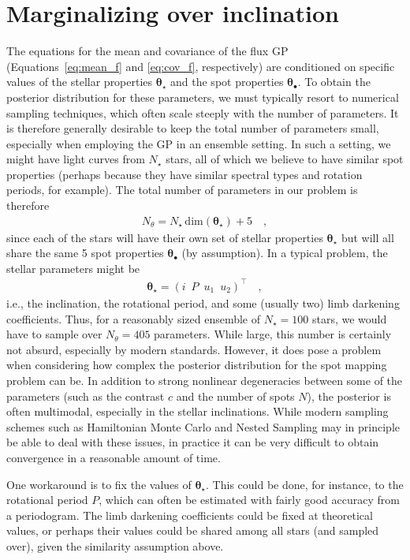 \documentclass[modern]{aastex62}
\begin{document}
\section{Marginalizing over inclination}
%
The equations for the mean and covariance of the flux GP
(Equations~\ref{eq:mean_f} and \ref{eq:cov_f}, respectively) are conditioned
on specific values of the stellar properties $\pmb{\theta}_\star$ and the
spot properties $\pmb{\theta}_\bullet$. To obtain the posterior distribution
for these parameters, we must typically resort to numerical sampling techniques,
which often scale steeply with the number of parameters. It is therefore generally
desirable to keep the total number of parameters small, especially when
employing the GP in an ensemble setting.
In such a setting, we might have light curves from $N_\star$ stars, all of which
we believe to have similar spot properties (perhaps because they have
similar spectral types and rotation periods, for example).
The total number of parameters in our problem is therefore
%
\begin{align}
    N_\theta = N_\star \, \mathrm{dim}(\pmb{\theta}_\star) + 5
    \quad,
\end{align}
%
since each of the stars will have their own set of stellar properties
$\pmb{\theta}_\star$ but will all share the same 5 spot properties
$\pmb{\theta}_\bullet$ (by assumption).
In a typical problem, the stellar parameters might be
%
\begin{align}
    \pmb{\theta}_\star =
    \left(
    i \,\,\,
    P \,\,\,
    u_1 \,\,\,
    u_2
    \right)^\top
    \quad,
\end{align}
%
i.e., the inclination, the rotational period, and some (usually two) limb
darkening coefficients. Thus, for a reasonably sized ensemble of $N_\star=100$
stars, we would have to sample over $N_\theta = 405$ parameters.
While large, this number is certainly not absurd, especially by modern standards.
However, it does pose
a problem when considering how complex the posterior distribution for the
spot mapping problem can be. In addition to strong nonlinear degeneracies
between some of the parameters (such as the contrast $c$ and the
number of spots $N$), the posterior is often multimodal, especially in the
stellar inclinations. While modern sampling schemes such as Hamiltonian
Monte Carlo and Nested Sampling may in principle be able to deal with these
issues, in practice it can be very difficult to obtain convergence in a
reasonable amount of time.

One workaround is to fix the values of $\pmb{\theta}_\star$. This could be done,
for instance, to the rotational period $P$, which can often be estimated with
fairly good accuracy from a periodogram. The limb darkening coefficients could
be fixed at theoretical values, or perhaps their values could be shared among
all stars (and sampled over), given the similarity assumption above.
\end{document}
